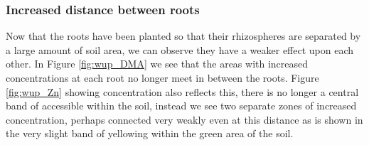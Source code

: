 \documentclass[11pt]{article}
\numberwithin{equation}{section}
\begin{document}
\subsubsection{Increased distance between roots}
 Now that the roots have been planted so that their rhizospheres are separated by a large amount of soil area, we can observe they have a weaker effect upon each other. In Figure \ref{fig:wup_DMA} we see that the areas with increased  concentrations at each root no longer meet in between the roots. Figure \ref{fig:wup_Zn} showing  concentration also reflects this, there is no longer a central band of accessible  within the soil, instead we see two separate zones of increased  concentration, perhaps connected very weakly even at this distance as is shown in the very slight band of yellowing within the green area of the soil.
\end{document}
